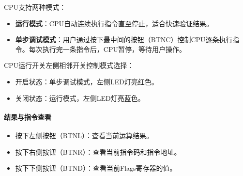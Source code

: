 \documentclass[lang=cn,a4paper,newtx]{elegantpaper}
\begin{document}
CPU支持两种模式：
\begin{itemize}
  \item \textbf{运行模式}：CPU自动连续执行指令直至停止，适合快速验证结果。
  \item \textbf{单步调试模式}：用户通过按下最中间的按钮（BTNC）控制CPU逐条执行指令。每次执行完一条指令后，CPU暂停，等待用户操作。
\end{itemize}

CPU运行开关左侧相邻开关控制模式选择：
\begin{itemize}
  \item 开启状态：单步调试模式，左侧LED灯亮红色。
  \item 关闭状态：运行模式，左侧LED灯亮蓝色。
\end{itemize}

\paragraph{结果与指令查看}

\begin{itemize}
  \item 按下左侧按钮（BTNL）：查看当前运算结果。
  \item 按下右侧按钮（BTNR）：查看当前指令码和指令地址。
  \item 按下下侧按钮（BTND）：查看当前Flags寄存器的值。
\end{itemize}
\end{document}
